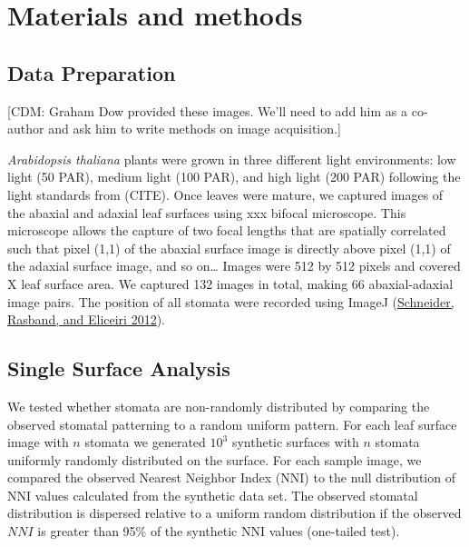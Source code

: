 \documentclass[12pt,halfline,a4paper,]{ouparticle}
\begin{document}
\hypertarget{materials-and-methods}{%
\section{Materials and methods}\label{materials-and-methods}}

\hypertarget{data-preparation}{%
\subsection{Data Preparation}\label{data-preparation}}

{[}CDM: Graham Dow provided these images. We'll need to add him as a
co-author and ask him to write methods on image acquisition.{]}

\emph{Arabidopsis thaliana} plants were grown in three different light
environments: low light (50 PAR), medium light (100 PAR), and high light
(200 PAR) following the light standards from (CITE). Once leaves were
mature, we captured images of the abaxial and adaxial leaf surfaces
using xxx bifocal microscope. This microscope allows the capture of two
focal lengths that are spatially correlated such that pixel (1,1) of the
abaxial surface image is directly above pixel (1,1) of the adaxial
surface image, and so on\ldots{} Images were 512 by 512 pixels and
covered X leaf surface area. We captured 132 images in total, making 66
abaxial-adaxial image pairs. The position of all stomata were recorded
using ImageJ (\protect\hyperlink{ref-schneider_nih_2012}{Schneider,
Rasband, and Eliceiri 2012}).

\hypertarget{single-surface-analysis}{%
\subsection{Single Surface Analysis}\label{single-surface-analysis}}

We tested whether stomata are non-randomly distributed by comparing the
observed stomatal patterning to a random uniform pattern. For each leaf
surface image with \(n\) stomata we generated \(10^3\) synthetic
surfaces with \(n\) stomata uniformly randomly distributed on the
surface. For each sample image, we compared the observed Nearest
Neighbor Index (\(\mathrm{NNI}\)) to the null distribution of
\(\mathrm{NNI}\) values calculated from the synthetic data set. The
observed stomatal distribution is dispersed relative to a uniform random
distribution if the observed \(NNI\) is greater than 95\% of the
synthetic \(\mathrm{NNI}\) values (one-tailed test).
\end{document}
